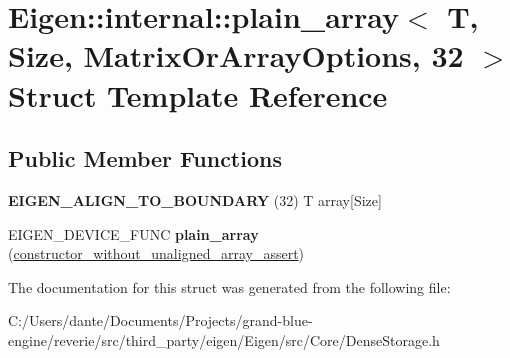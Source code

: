 \hypertarget{struct_eigen_1_1internal_1_1plain__array_3_01_t_00_01_size_00_01_matrix_or_array_options_00_0132_01_4}{}\section{Eigen\+::internal\+::plain\+\_\+array$<$ T, Size, Matrix\+Or\+Array\+Options, 32 $>$ Struct Template Reference}
\label{struct_eigen_1_1internal_1_1plain__array_3_01_t_00_01_size_00_01_matrix_or_array_options_00_0132_01_4}
\subsection*{Public Member Functions}
\begin{DoxyCompactItemize}
\item 
\mbox{\label{struct_eigen_1_1internal_1_1plain__array_3_01_t_00_01_size_00_01_matrix_or_array_options_00_0132_01_4_a7eaecb638c0586dd70cd7e4e1e82f8b9}} 
{\bfseries E\+I\+G\+E\+N\+\_\+\+A\+L\+I\+G\+N\+\_\+\+T\+O\+\_\+\+B\+O\+U\+N\+D\+A\+RY} (32) T array\mbox{[}Size\mbox{]}
\item 
\mbox{\label{struct_eigen_1_1internal_1_1plain__array_3_01_t_00_01_size_00_01_matrix_or_array_options_00_0132_01_4_a4c86669c116bfd845b8c1dc9107724de}} 
E\+I\+G\+E\+N\+\_\+\+D\+E\+V\+I\+C\+E\+\_\+\+F\+U\+NC {\bfseries plain\+\_\+array} (\mbox{\hyperlink{struct_eigen_1_1internal_1_1constructor__without__unaligned__array__assert}{constructor\+\_\+without\+\_\+unaligned\+\_\+array\+\_\+assert}})
\end{DoxyCompactItemize}


The documentation for this struct was generated from the following file\+:\begin{DoxyCompactItemize}
\item 
C\+:/\+Users/dante/\+Documents/\+Projects/grand-\/blue-\/engine/reverie/src/third\+\_\+party/eigen/\+Eigen/src/\+Core/Dense\+Storage.\+h\end{DoxyCompactItemize}

